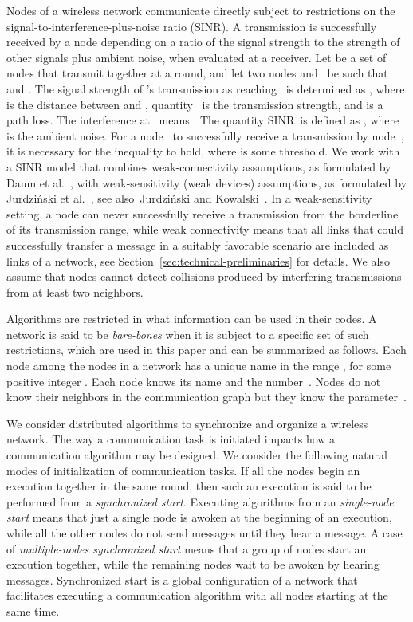 \documentclass[11pt]{article}
\begin{document}
Nodes of a wireless network communicate directly subject to restrictions on the signal-to-interference-plus-noise ratio (SINR). 
A transmission is successfully received by a node depending on a ratio of the signal strength to the strength of other signals plus ambient noise, when evaluated at a receiver.
Let  be a set of nodes that transmit together at a round, and let two nodes  and~ be such that  and .
The signal strength of 's transmission as reaching~ is determined as  , where  is the distance between  and , quantity~ is the transmission strength, and  is a path loss.
The interference at~ means . 
The quantity SINR\,  is defined as , where  is the ambient noise.
For a node~ to successfully receive a transmission by node~, it is necessary for the inequality  to hold, where  is some threshold.
We work with a SINR model that combines weak-connectivity assumptions, as formulated by Daum et al.~\cite{DGKN13}, with weak-sensitivity (weak devices) assumptions, as formulated by Jurdzi\'nski et al.~\cite{JKS-ICALP-13}, see also~Jurdzi\'nski and Kowalski~\cite{JurdzinskiK-encyclopedia}.
In a weak-sensitivity setting, a node can never successfully receive  a transmission from the borderline of its transmission range, while weak connectivity means that all links that could successfully transfer a message in a suitably favorable scenario are included as links of a network,  see Section~\ref{sec:technical-preliminaries} for details.
We also assume that nodes cannot  detect collisions produced by interfering transmissions from at least two neighbors.


Algorithms are restricted in what information can be used in their codes.
A network is said to be \emph{bare-bones} when it is subject to a specific set of such restrictions, which are used in this paper and can be summarized as follows.
Each node among the  nodes in a network has a unique name in the range , for some positive integer .
Each node knows its name and the number~.
Nodes do not know their neighbors in the communication graph but they know the parameter~. 


We consider distributed algorithms to synchronize and organize a wireless network.
The way a communication task is initiated impacts how a communication algorithm may  be designed.
We consider the following natural modes of initialization of communication tasks.
If all the nodes begin an execution together in the same round, then such an execution is said to be performed from a \emph{synchronized start}.
Executing algorithms from an \emph{single-node start} means that just a single node is awoken at the beginning of an execution, while all the other nodes do not send messages until they hear a message.
A case of \emph{multiple-nodes synchronized start} means that a group of nodes start an execution together, while the remaining nodes wait to be awoken by hearing messages.
Synchronized start is a global configuration of a network that facilitates executing a communication algorithm with all nodes starting at the same time.
\end{document}
